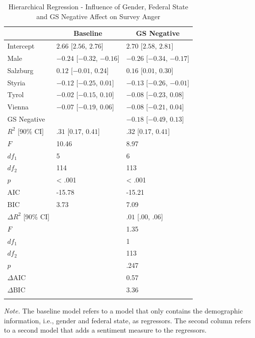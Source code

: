 \documentclass[
  english,
  jou,floatsintext]{apa7}
\begin{document}
\begin{table}[b]

\begin{center}
\begin{threeparttable}

\caption{\label{tab:table-ang-GS}Hierarchical Regression - Influence of Gender, Federal State and GS Negative Affect on Survey Anger}

\small{

\begin{tabular}{lll}
\toprule
 & \multicolumn{1}{c}{Baseline} & \multicolumn{1}{c}{GS Negative}\\
\midrule
Intercept & $2.66$ $[2.56$, $2.76]$ & $2.70$ $[2.58$, $2.81]$\\
Male & $-0.24$ $[-0.32$, $-0.16]$ & $-0.26$ $[-0.34$, $-0.17]$\\
Salzburg & $0.12$ $[-0.01$, $0.24]$ & $0.16$ $[0.01$, $0.30]$\\
Styria & $-0.12$ $[-0.25$, $0.01]$ & $-0.13$ $[-0.26$, $-0.01]$\\
Tyrol & $-0.02$ $[-0.15$, $0.10]$ & $-0.08$ $[-0.23$, $0.08]$\\
Vienna & $-0.07$ $[-0.19$, $0.06]$ & $-0.08$ $[-0.21$, $0.04]$\\
GS Negative &  & $-0.18$ $[-0.49$, $0.13]$\\
$R^2$ [90\% CI] & $.31$ $[0.17$, $0.41]$ & $.32$ $[0.17$, $0.41]$\\
$F$ & 10.46 & 8.97\\
$df_1$ & 5 & 6\\
$df_2$ & 114 & 113\\
$p$ & < .001 & < .001\\
$\mathrm{AIC}$ & -15.78 & -15.21\\
$\mathrm{BIC}$ & 3.73 & 7.09\\
$\Delta R^2$ [90\% CI] &  & $.01$ $[.00$, $.06]$\\
$F$ &  & 1.35\\
$df_1$ &  & 1\\
$df_2$ &  & 113\\
$p$ &  & .247\\
$\Delta \mathrm{AIC}$ &  & 0.57\\
$\Delta \mathrm{BIC}$ &  & 3.36\\
\bottomrule
\addlinespace
\end{tabular}

}

\begin{tablenotes}[para]
\normalsize{\textit{Note.} The baseline model refers to a model that only contains the demographic information, i.e., gender and federal state, as regressors. The second column refers to a second model that adds a sentiment measure to the regressors.}
\end{tablenotes}

\end{threeparttable}
\end{center}

\end{table}
\end{document}
